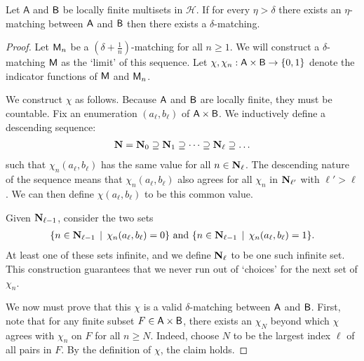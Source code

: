 \begin{theorem}
\label{thm-bottleneck-inf-attained}
Let $\mathsf{A}$ and $\mathsf{B}$ be locally finite multisets in $\mathcal{H}$. If for every $\eta > \delta$ there exists an $\eta$-matching between $\mathsf{A}$ and $\mathsf{B}$ then there exists a $\delta$-matching.
\end{theorem}
\begin{proof}
Let $\mathsf{M}_n$ be a $(\delta + \tfrac{1}{n})$-matching for all $n \geq 1$. We will construct a $\delta$-matching $\mathsf{M}$ as the `limit' of this sequence. Let $\chi, \chi_n : \mathsf{A} \times \mathsf{B} \to \{0, 1\}$ denote the indicator functions of $\mathsf{M}$ and $\mathsf{M}_n$.

We construct $\chi$ as follows. Because $\mathsf{A}$ and $\mathsf{B}$ are locally finite, they must be countable. Fix an enumeration $(a_\ell, b_\ell)$ of $\mathsf{A} \times \mathsf{B}$. We inductively define a descending sequence:
\begin{align*}
\mathbf{N} = \mathbf{N}_0 \supseteq \mathbf{N}_1 \supseteq \dots \supseteq \mathbf{N}_\ell \supseteq \dots
\end{align*}
such that $\chi_n(a_\ell, b_\ell)$ has the same value for all $n \in \mathbf{N}_\ell$. The descending nature of the sequence means that $\chi_n(a_\ell, b_\ell)$ also agrees for all $\chi_n$ in $\mathbf{N}_{\ell'}$ with $\ell' > \ell$. We can then define $\chi(a_\ell, b_\ell)$ to be this common value.

Given $\mathbf{N}_{\ell-1}$, consider the two sets
\begin{align*}
\{n \in \mathbf{N}_{\ell-1} \, \mid \, \chi_n(a_\ell, b_\ell) = 0\} \text{ and } \{n \in \mathbf{N}_{\ell-1} \, \mid \, \chi_n(a_\ell, b_\ell) = 1\}.
\end{align*}
At least one of these sets infinite, and we define $\mathbf{N}_\ell$ to be one such infinite set. This construction guarantees that we never run out of `choices' for the next set of $\chi_n$.

We now must prove that this $\chi$ is a valid $\delta$-matching between $\mathsf{A}$ and $\mathsf{B}$. First, note that for any finite subset $F \in \mathsf{A} \times \mathsf{B}$, there exists an $\chi_N$ beyond which $\chi$ agrees with $\chi_n$ on $F$ for all $n \geq N$. Indeed, choose $N$ to be the largest index $\ell$ of all pairs in $F$. By the definition of $\chi$, the claim holds.


\end{proof}
